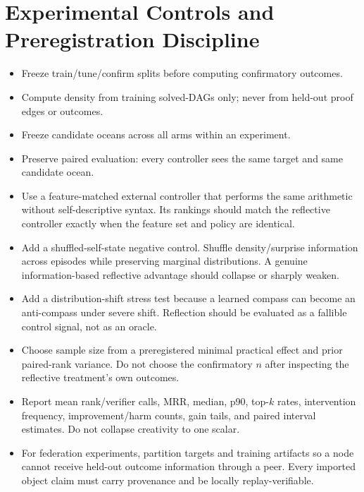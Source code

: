 \documentclass[11pt]{article}
\begin{document}
\section{Experimental Controls and Preregistration Discipline}
\begin{itemize}
\item Freeze train/tune/confirm splits before computing confirmatory outcomes.
\item Compute density from training solved-DAGs only; never from held-out proof edges or outcomes.
\item Freeze candidate oceans across all arms within an experiment.
\item Preserve paired evaluation: every controller sees the same target and same candidate ocean.
\item Use a feature-matched external controller that performs the same arithmetic without self-descriptive syntax. Its rankings should match the reflective controller exactly when the feature set and policy are identical.
\item Add a shuffled-self-state negative control. Shuffle density/surprise information across episodes while preserving marginal distributions. A genuine information-based reflective advantage should collapse or sharply weaken.
\item Add a distribution-shift stress test because a learned compass can become an anti-compass under severe shift. Reflection should be evaluated as a fallible control signal, not as an oracle.
\item Choose sample size from a preregistered minimal practical effect and prior paired-rank variance. Do not choose the confirmatory $n$ after inspecting the reflective treatment's own outcomes.
\item Report mean rank/verifier calls, MRR, median, p90, top-$k$ rates, intervention frequency, improvement/harm counts, gain tails, and paired interval estimates. Do not collapse creativity to one scalar.
\item For federation experiments, partition targets and training artifacts so a node cannot receive held-out outcome information through a peer. Every imported object claim must carry provenance and be locally replay-verifiable.
\end{itemize}
\end{document}
